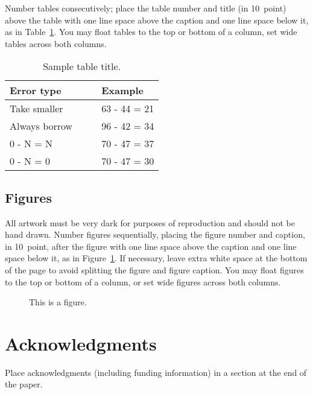 \documentclass[10pt,letterpaper]{article}
\begin{document}
Number tables consecutively; place the table number and title (in
10~point) above the table with one line space above the caption and
one line space below it, as in Table~\ref{sample-table}. You may float
tables to the top or bottom of a column, set wide tables across both
columns.

\begin{table}[!ht]
\begin{center} 
\caption{Sample table title.} 
\label{sample-table} 
\vskip 0.12in
\begin{tabular}{ll} 
\hline
Error type    &  Example \\
\hline
Take smaller        &   63 - 44 = 21 \\
Always borrow~~~~   &   96 - 42 = 34 \\
0 - N = N           &   70 - 47 = 37 \\
0 - N = 0           &   70 - 47 = 30 \\
\hline
\end{tabular} 
\end{center} 
\end{table}


\subsection{Figures}

All artwork must be very dark for purposes of reproduction and should
not be hand drawn. Number figures sequentially, placing the figure
number and caption, in 10~point, after the figure with one line space
above the caption and one line space below it, as in
Figure~\ref{sample-figure}. If necessary, leave extra white space at
the bottom of the page to avoid splitting the figure and figure
caption. You may float figures to the top or bottom of a column, or
set wide figures across both columns.

\begin{figure}[ht]
\begin{center}
\end{center}
\caption{This is a figure.} 
\label{sample-figure}
\end{figure}


\section{Acknowledgments}

Place acknowledgments (including funding information) in a section at
the end of the paper.
\end{document}
